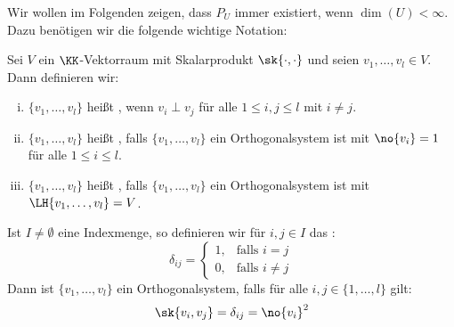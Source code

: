 Wir wollen im Folgenden zeigen, dass $P_U$ immer existiert, wenn $\dim(U) < \infty$.
Dazu benötigen wir die folgende wichtige Notation:

\begin{definition}
	\label{def:4.5}
	Sei $V$ ein $\KK$-Vektorraum mit Skalarprodukt $\sk{\cdot,\cdot}$ und seien $v_1,\dots,v_l \in V$.
	Dann definieren wir:
	\begin{enumerate}[(i)]
		\item $\{v_1,\dots,v_l\}$ heißt , wenn $v_i \perp v_j$ für alle $1 \leq i,j \leq l$ mit $i \neq j$.
		\item $\{v_1,\dots,v_l\}$ heißt , falls $\{v_1,\dots,v_l\}$ ein Orthogonalsystem ist mit $\no{v_i} = 1$ für alle $1 \leq i \leq l$.
		\item $\{v_1,\dots,v_l\}$ heißt , falls $\{v_1,\dots,v_l\}$ ein Orthogonalsystem ist mit $\LH\{v_1,\dots,v_l\} = V$.
	\end{enumerate}
\end{definition}

\begin{definition}[Kroneckersymbol]
	\label{def:4.6}
	Ist $I \neq \emptyset$ eine Indexmenge, so definieren wir für $i,j \in I$ das :
	\[
		\delta_{ij} = \begin{cases}
			1, & \text{falls } i = j \\
			0, & \text{falls } i \neq j
		\end{cases}
	\]
	Dann ist $\{v_1,\dots,v_l\}$ ein Orthogonalsystem, falls für alle $i,j \in \{1,\dots,l\}$ gilt:
	\[
		\sk{v_i,v_j} = \delta_{ij} = \no{v_i}^2
	\]
\end{definition}

